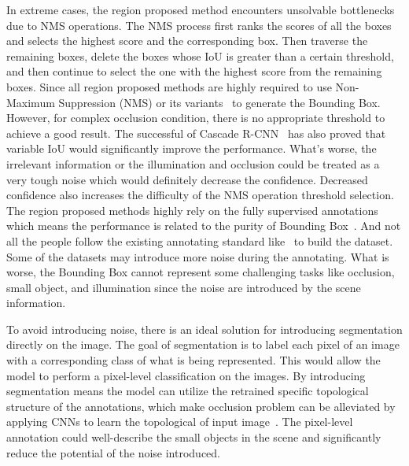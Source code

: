 \documentclass{article}
\begin{document}
{In extreme cases, the region proposed method encounters unsolvable bottlenecks due to NMS operations. The NMS process first ranks the scores of all the boxes and selects the highest score and the corresponding box. Then traverse the remaining boxes, delete the boxes whose IoU is greater than a certain threshold, and then continue to select the one with the highest score from the remaining boxes.
Since all region proposed methods are highly required to use Non-Maximum Suppression (NMS) or its variants~\cite{bodla2017soft} to generate the Bounding Box. However, for complex occlusion condition, there is no appropriate threshold to achieve a good result. The successful of Cascade R-CNN~\cite{pang2017cascade} has also proved that variable IoU would significantly improve the performance. What's worse, the irrelevant information or the illumination and occlusion could be treated as a very tough noise which would definitely decrease the confidence.
Decreased confidence also increases the difficulty of the NMS operation threshold selection. The region proposed methods highly rely on the fully supervised annotations which means the performance is related to the purity of Bounding Box~\cite{guo2016deep}. And not all the people follow the existing annotating standard like~\cite{voc2011guidelines} to build the dataset. Some of the datasets may introduce more noise during the annotating. What is worse, the Bounding Box cannot represent some challenging tasks like occlusion, small object, and illumination since the noise are introduced by the scene information.



To avoid introducing noise, there is an ideal solution for introducing segmentation directly on the image. The goal of segmentation is to label each pixel of an image with a corresponding class of what is being represented. This would allow the model to perform a pixel-level classification on the images. By introducing segmentation means the model can utilize the retrained specific topological structure of the annotations, which make occlusion problem can be alleviated by applying CNNs to learn the topological of input image~\cite{lee2019ficklenet}. The pixel-level annotation could well-describe the small objects in the scene and significantly reduce the potential of the noise introduced.

}
\end{document}
